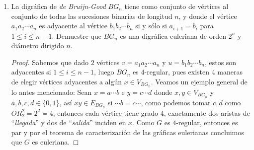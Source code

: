 \documentclass{article}
\begin{document}
\begin{enumerate}
\begin{proof}
\begin{itemize}
      Como todos los vértices son consecutivos, notemos que cada vértice de $C$ es cola y cabeza para dos flechas distintas en el circuito $\rightarrow$ para todo $V_k$ que pertenece a $C$ existe $d^+$ y $d^-$ que une a $V_k$ con sus vértices adyacentes $V_{k-1}$ y $V_{k+1}$.

      Así, cada vértice de la trayectoria $C$ tendrá  una ``arista" $d^+$ y una $d^-$ (ya que $D$ es par y por construcción de $C$).

      Por lo tanto, $d^+ = d^-$ ya que para todo vértice de $D$ se pueden sumar el número de veces que aparecen en la trayectoria $C$ y preservará la igualdad anterior.

    \item $\Longleftarrow$.

      Sea $D$ conexa y para toda $v$ que pertenece a $V_D$ se tiene que $d^+ = d^- \rightarrow$ para toda $v$ que pertenece a $V_D$, existe al menos una $d^+$ y una $d^-$.

      Por lo que para todo $v$ que pertenece a $V_D$, $v$ es mayor igual a $2$. Pero el grado de $v$ siempre debe ser par, ya que tenemos la igualdad $d^+ = d^- \rightarrow$ $D$ es par.

      Por lo tanto, por teorema visto en clase tenemos que $D$ es una gráfica eucliriana.
    \end{itemize}
  \end{proof}
\item La digr\'afica de {\em de Bruijn-Good} $BG_n$ tiene como
  conjunto de v\'ertices al conjunto de todas las sucesiones
  binarias de longitud $n$, y donde el v\'ertice $a_1 a_2
  \cdots a_n$ es adyacente al v\'ertice $b_1 b_2 \cdots b_n$
  si y s\'olo si $a_{i+1} = b_i$ para $1 \le i \le n-1$.  Demuestre
  que $BG_n$ es una digr\'afica euleriana de orden $2^n$ y
  di\'ametro dirigido $n$.

  \begin{proof}
    Sabemos que dado $2$ vértices $v = a_1a_2 \dotsm a_n$ y
    $u = b_1b_2 \dotsm b_n$, estos son adyacentes si $1 \leq i \leq n -1$,
    luego $BG_n$ es $4$-regular, pues existen $4$ maneras de elegir
    vértices adyacentes a algún $x \in V_{BG_n}$. Veamos un ejemplo
    general de lo antes mencionado: Sean $x = a \dotsm b$ e $y = c \dotsm d$
    donde $x, y \in V_{BG_n}$ y $a,b,c,d \in \{0,1\}$, así $xy \in E_{BG_n}$
    si $\dotsm b = c \dotsm$, como podemos tomar $c,d$ como $OR_2^2 = 2^2 = 4$,
    entonces cada vértice tiene grado $4$, exactamente dos aristas de
    ``\textit{llegada}'' y dos de ``\textit{salida}'' inciden en $x$.
    Como $G$ es $4$-regular, entonces es par y por el teorema de caracterización
    de las gráficas eulerianas concluimos que $G$ es euleriana.


\end{proof}
\end{enumerate}
\end{document}
